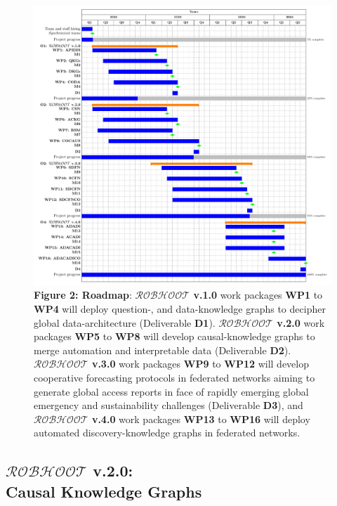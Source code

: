 \documentclass[12pt, a4paper]{article} %
\begin{document}
 \begin{figure}[h!]
   \includegraphics[width=1\textwidth]{Figures/GanttChart.pdf} {\small
     {\bf Figure 2: Roadmap}: {\bf $\mathcal{ROBHOOT}$ v.1.0} work
     packages {\bf WP1} to {\bf WP4} will deploy question-, and
     data-knowledge graphs to decipher global data-architecture
     (Deliverable {\bf D1}). {\bf $\mathcal{ROBHOOT}$ v.2.0} work
     packages {\bf WP5} to {\bf WP8} will develop causal-knowledge
     graphs to merge automation and interpretable data ({Deliverable
       \bf D2}). {\bf $\mathcal{ROBHOOT}$ v.3.0} work packages {\bf
       WP9} to {\bf WP12} will develop cooperative forecasting
     protocols in federated networks aiming to generate global access
     reports in face of rapidly emerging global emergency and
     sustainability challenges (Deliverable {\bf D3}), and {\bf
       $\mathcal{ROBHOOT}$ v.4.0} work packages {\bf WP13} to {\bf
       WP16} will deploy automated discovery-knowledge graphs in
     federated networks.}
\end{figure}


\subsection{{\bf $\mathcal{ROBHOOT}$ v.2.0}: \\ Causal Knowledge Graphs}
\end{document}
